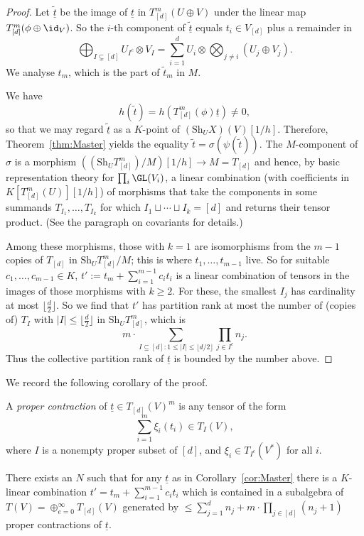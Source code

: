 \documentclass{amsart}
\newcommand{\Sh}{\mathrm{Sh}}
\newcommand{\ul}[1]{\underline{#1}}
\newcommand{\floor}[1]{\lfloor #1 \rfloor}
\begin{document}
\begin{proof}
Let $\tilde{\ul{t}}$ be the image of $\ul{t}$ in $T_{[d]}^m(U \oplus V)$ under
the linear map $T_{[d]}^m(\phi \oplus \id_V)$. So the $i$-th component
of $\tilde{\ul{t}}$ equals $t_i \in V_{[d]}$ plus a remainder in 
\[ \bigoplus_{I \subsetneq [d]} U_{I^c} \otimes V_I
= \sum_{i=1}^d U_i \otimes \bigotimes_{j \neq i} (U_j \oplus V_j). \]
We analyse $t_m$, which is the part of $\tilde{t}_m$ in $M$.

We have 
\[ h(\tilde{t})=h(T^m_{[d]}(\phi)\ul{t})\neq 0, \]
so that we may regard
$\tilde{\ul{t}}$ as a $K$-point of $(\Sh_U X)(V)[1/h]$. Therefore, 
Theorem~\ref{thm:Master} yields the equality
$\tilde{t}=\sigma(\psi(\tilde{t}))$. The $M$-component
of $\sigma$ is a morphism $((\Sh_U T_{[d]}^m)/M)[1/h] \to M=T_{[d]}$ and
hence, by basic representation theory for $\prod_i \GL(V_i)$, a linear
combination (with coefficients in $K[T_{[d]}^m(U)][1/h]$) of morphisms
that take the components in some summands $T_{I_1},\ldots,T_{I_k}$
for which $I_1 \sqcup \cdots \sqcup I_k=[d]$ and returns their tensor
product. (See the paragraph \cite[\S 4.8]{Draisma18b} on covariants
for details.)

Among these morphisms, those with $k=1$ are isomorphisms from the
$m-1$ copies of $T_{[d]}$ in $\Sh_U T_{[d]}^m/M$; this is where
$t_1,\ldots,t_{m-1}$ live. So for suitable $c_1,\ldots,c_{m-1} \in K$,
$t':=t_m+\sum_{i=1}^{m-1} c_i t_i$ is a linear combination of
tensors in the images of those morphisms with $k \geq 2$. For these, the smallest
$I_j$ has cardinality at most 
$\floor{\frac{d}{2}}$. So we find that $t'$
has partition rank at most 
the number of (copies of) $T_I$
with $|I| \leq \floor{\frac{d}{2}}$ in $\Sh_U T_{[d]}^m$, which is
\[ m\cdot\sum_{I \subseteq [d]: 1 \leq |I| \leq \floor{d/2}} \prod_{j \in I^c} n_j.
\]
Thus the collective partition rank of $\ul{t}$ is bounded by
the number above.
\end{proof}

We record the following corollary of the proof.
\begin{de}
A {\em proper contraction}
of $\ul{t} \in T_{[d]}(V)^m$ is any tensor of the form
\[ \sum_{i=1}^m \xi_i(t_i) \in T_{I}(V), \]
where $I$ is a nonempty proper subset of $[d]$, and $\xi_i \in
T_{I^c}(V^*)$ for all $i$.
\end{de}

\begin{cor} \label{cor:Algebra}
There exists an $N$ such
that for any $\ul{t}$ as in Corollary~\ref{cor:Master} there is a $K$-linear
combination $t' = t_m+\sum_{i=1}^{m-1} c_i t_i$ which is contained in a subalgebra of \linebreak 
$T(V) = \oplus_{e=0}^\infty T_{[d]}(V)$ generated by  
$ \le \sum_{j=1}^d n_j + m\cdot \prod_{j\in [d]} (n_j+1)$ proper
contractions of $\ul{t}$. 
\end{cor}
\end{document}
